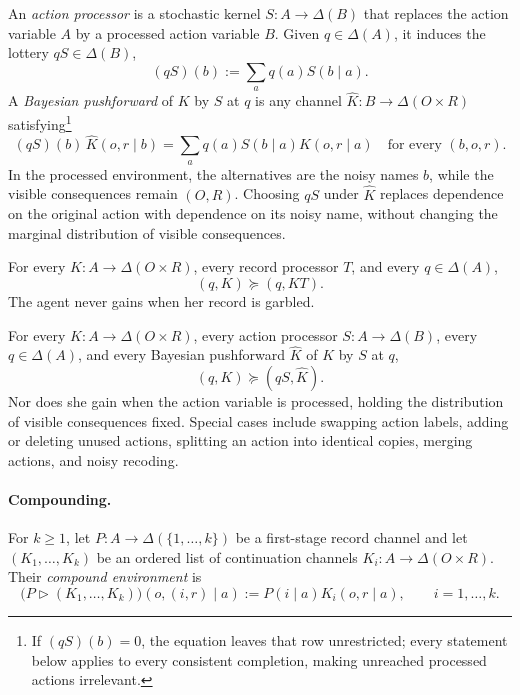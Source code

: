 \documentclass[11pt,a4paper]{article}
\theoremstyle{definition}
\newcommand{\D}{\Delta}
\newcommand{\1}{\mathbf 1}
\begin{document}
An \emph{action processor} is a stochastic kernel $S:A\to\D(B)$ that replaces the action variable $A$ by a
processed action variable $B$.  Given $q\in\D(A)$, it induces the lottery $qS\in\D(B)$,
\[
 (qS)(b):=\sum_aq(a)S(b\mid a).
\]
A \emph{Bayesian pushforward} of $K$ by $S$ at $q$ is any channel $\widehat K:B\to\D(O\times R)$
satisfying\footnote{If $(qS)(b)=0$, the
equation leaves that row unrestricted; every statement below applies to every consistent completion, making
unreached processed actions irrelevant.}
\begin{equation}
 (qS)(b)\,\widehat K(o,r\mid b)
 =\sum_a q(a)S(b\mid a)K(o,r\mid a)
 \quad\text{for every }(b,o,r).
 \label{eq:action-processing}
\end{equation}
In the processed environment, the alternatives are the noisy names $b$, while the visible consequences remain
$(O,R)$.  Choosing $qS$ under $\widehat K$ replaces dependence on the original action with dependence on its
noisy name, without changing the marginal distribution of visible consequences.

\begin{description}[leftmargin=*,style=sameline]

\item[(A6) Record data processing.]
For every $K:A\to\D(O\times R)$, every record processor $T$, and every $q\in\D(A)$,
\[
 (q,K)\succeq(q,KT).
\]
The agent never gains when her record is garbled.

\item[(A7) Action data processing.]
For every $K:A\to\D(O\times R)$, every action processor $S:A\to\D(B)$, every $q\in\D(A)$, and every Bayesian
pushforward $\widehat K$ of $K$ by $S$ at $q$,
\[
 (q,K)\succeq(qS,\widehat K).
\]
Nor does she gain when the action variable is processed, holding the distribution of visible consequences fixed. Special cases include swapping action labels, adding or deleting unused actions, splitting an action into identical copies, merging actions, and noisy recoding. 
\end{description}

\paragraph{Compounding.}
For $k\ge1$, let $P:A\to\D(\{1,\ldots,k\})$ be a first-stage record channel and let
$(K_1,\ldots,K_k)$ be an ordered list of continuation channels $K_i:A\to\D(O\times R)$.  Their
\emph{compound environment} is
\begin{equation}
 \bigl(P\triangleright(K_1,\ldots,K_k)\bigr)(o,(i,r)\mid a)
 :=P(i\mid a)K_i(o,r\mid a),
 \qquad i=1,\ldots,k.
 \label{eq:compound}
\end{equation}
\end{document}
